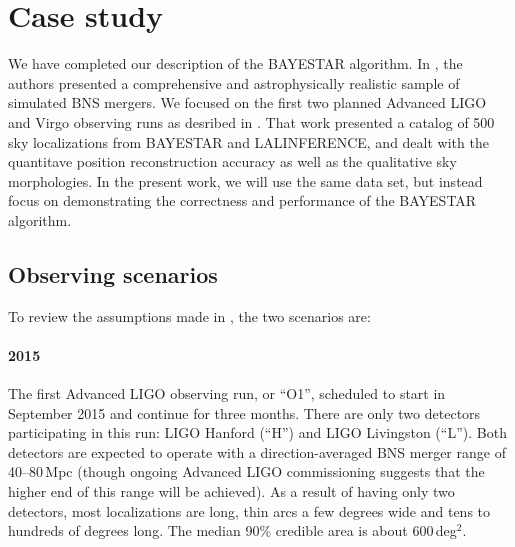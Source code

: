 \documentclass[amsmath,amssymb,aps,prx,reprint,nopreprintnumbers,nofootinbib,showpacs]{revtex4-1}
\begin{document}
\section{Case study}
\label{sec:case-study}

We have completed our description of the \ac{BAYESTAR} algorithm. In \cite{FirstTwoYears}, the authors presented a comprehensive and astrophysically realistic sample of simulated \ac{BNS} mergers. We focused on the first two planned Advanced LIGO and Virgo observing runs as desribed in \cite{LIGOObservingScenarios}. That work presented a catalog of 500 sky localizations from \ac{BAYESTAR} and LALINFERENCE, and dealt with the quantitave position reconstruction accuracy as well as the qualitative sky morphologies. In the present work, we will use the same data set, but instead focus on demonstrating the correctness and performance of the \ac{BAYESTAR} algorithm.

\subsection{Observing scenarios}

To review the assumptions made in \cite{FirstTwoYears}, the two scenarios are:

\paragraph*{2015} The first Advanced \acs{LIGO} observing run, or ``O1'', scheduled to start in September 2015 and continue for three months. There are only two detectors participating in this run: \acs{LIGO} Hanford (``H'') and \acs{LIGO} Livingston (``L''). Both detectors are expected to operate with a direction\nobreakdashes-averaged \ac{BNS} merger range of 40\nobreakdashes--80\,Mpc (though ongoing Advanced \acs{LIGO} commissioning suggests that the higher end of this range will be achieved). As a result of having only two detectors, most localizations are long, thin arcs a few degrees wide and tens to hundreds of degrees long. The median 90\% credible area is about 600\,deg$^2$.
\end{document}
